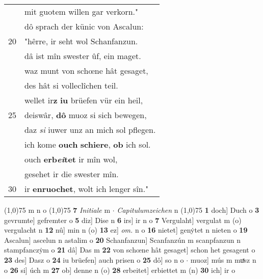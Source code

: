\documentclass[8pt,a4paper,notitlepage]{article}
\begin{document}
\begin{table}[ht]
\begin{minipage}[t]{0.5\linewidth}
\begin{tabular}{rl}
 & mit guotem willen gar verkorn."\\ 
 & dô sprach der künic von Ascalun:\\ 
20 & "hêrre, ir seht wol Schanfanzun.\\ 
 & dâ ist mîn swester ûf, ein maget.\\ 
 & waz munt von schœne hât gesaget,\\ 
 & des hât si volleclîchen teil.\\ 
 & wellet ir\textbf{z} \textbf{iu} brüefen vür ein heil,\\ 
25 & deiswâr, \textbf{dô} muoz si sich bewegen,\\ 
 & daz \textit{si} iuwer unz an mich sol pflegen.\\ 
 & ich kome \textbf{ouch} \textbf{schiere}, \textbf{ob} ich sol.\\ 
 & ouch \textbf{erb\textit{ei}tet} ir mîn wol,\\ 
 & gesehet ir die swester mîn.\\ 
30 & ir \textbf{enruochet}, wolt ich lenger sîn."\\ 
\end{tabular}
\scriptsize
\line(1,0){75} \newline
m n o \newline
\line(1,0){75} \newline
\textbf{7} \textit{Initiale} m   $\cdot$ \textit{Capitulumzeichen} n  \newline
\line(1,0){75} \newline
\textbf{1} doch] Duch o \textbf{3} gevrumte] gefremter o \textbf{5} diz] Dise n \textbf{6} irs] ir n o \textbf{7} Vergulaht] vergulat m (o) vergulacht n \textbf{12} nû] min n (o) \textbf{13} ez] \textit{om.} n o \textbf{16} nietet] genẏtet n nieten o \textbf{19} Ascalun] ascelun n astalim o \textbf{20} Schanfanzun] Scanfanzún m scanpfanzun n stampfanczẏm o \textbf{21} dâ] Das m \textbf{22} von schœne hât gesaget] schon het gesagent o \textbf{23} des] Dasz o \textbf{24} iu brüefen] auch prisen o \textbf{25} dô] so n o  $\cdot$ muoz] mús m muͯsz n o \textbf{26} si] úch m \textbf{27} ob] denne n (o) \textbf{28} erbeitet] erbiettet m (n) \textbf{30} ich] ir o \newline
\end{minipage}
\end{table}
\newpage
\end{document}
